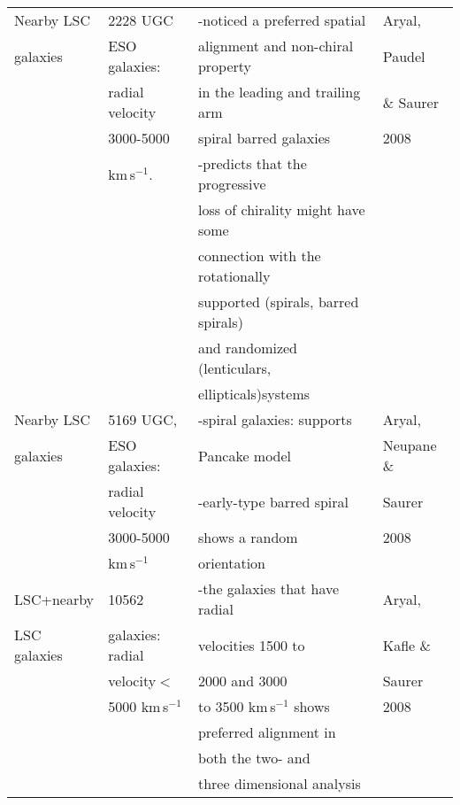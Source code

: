 \begin{center}
\begin{tabular}[lp=7cm]{|l|l|l|l|}
\hline
Nearby LSC&2228 UGC&-noticed a preferred spatial&Aryal, \\
galaxies&ESO galaxies:&alignment and non-chiral property&Paudel\\
&radial velocity&in the leading and trailing arm&\& Saurer\\
&3000-5000&spiral barred galaxies&2008\\
&km\,s$^{-1}$.&-predicts that the progressive&\\
&&loss of chirality might have some&\\
&&connection with the rotationally&\\
&&supported (spirals, barred spirals)&\\
&&and randomized (lenticulars,&\\
&&ellipticals)systems&\\
\hline
Nearby LSC&5169 UGC,&-spiral galaxies: supports&Aryal,\\
galaxies&ESO galaxies:&Pancake model&Neupane \&\\
&radial velocity&-early-type barred spiral&Saurer\\
&3000-5000&shows a random&2008\\
&km\,s$^{-1}$&orientation&\\
\hline
LSC+nearby&10562&-the galaxies that have radial&Aryal,\\
LSC galaxies&galaxies: radial&velocities 1500 to&Kafle \&\\
&velocity$<$&2000 and 3000&Saurer\\
&5000 km\,s$^{-1}$&to 3500 km\,s$^{-1}$ shows&2008\\
&&preferred alignment in&\\
&&both the two- and&\\
&&three dimensional analysis&\\
\hline
\end{tabular}
\end{center}
